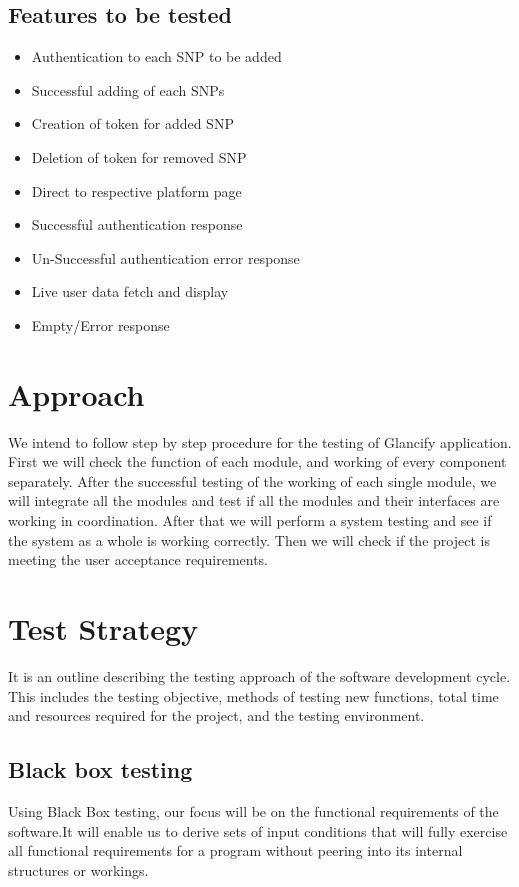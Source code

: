 \documentclass[12pt]{article}
\begin{document}
    \subsection{Features to be tested}
    \begin{itemize}
        \item Authentication to each SNP to be added
        \item Successful adding of each SNPs
        \item Creation of token for added SNP
        \item Deletion of token for removed SNP
        \item Direct to respective platform page
        \item Successful authentication response
        \item Un-Successful authentication error response
        \item Live user data fetch and display
        \item Empty/Error response 
    \end{itemize}
    
    \section{Approach}
    We intend to follow step by step procedure for the testing of Glancify application. First we will check the function of each module, and working of every component separately. After the successful testing of the working of each single module, we will integrate all the modules and test if all the modules and their interfaces are working in coordination. After that we will perform a system testing and see if the system as a whole is working correctly. Then we will check if the project is meeting the user acceptance requirements.
    
    \section{Test Strategy}
    It is an outline describing the testing approach of the software development cycle. This includes the testing objective, methods of testing new functions, total time and resources required for the project, and the testing environment.
    
    \subsection{Black box testing}
    Using Black Box testing, our focus will be on the functional requirements of the software.It will enable us to derive sets of input conditions that will fully exercise all functional requirements for a program without peering into its internal structures or workings.
    
\end{document}
